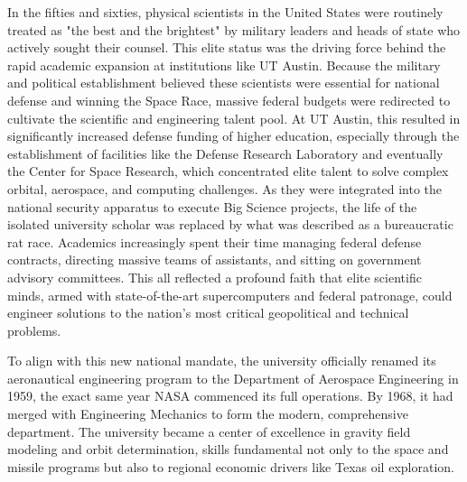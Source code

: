 In the fifties and sixties, physical scientists in the United States were routinely treated as "the best and the brightest" by military leaders and heads of state who actively sought their counsel. This elite status was the driving force behind the rapid academic expansion at institutions like UT Austin. Because the military and political establishment believed these scientists were essential for national defense and winning the Space Race, massive federal budgets were redirected to cultivate the scientific and engineering talent pool. At UT Austin, this resulted in significantly increased defense funding of higher education, especially through the establishment of facilities like the Defense Research Laboratory and eventually the Center for Space Research, which concentrated elite talent to solve complex orbital, aerospace, and computing challenges. As they were integrated into the national security apparatus to execute Big Science projects, the life of the isolated university scholar was replaced by what was described as a bureaucratic rat race. Academics increasingly spent their time managing federal defense contracts, directing massive teams of assistants, and sitting on government advisory committees. This all reflected a profound faith that elite scientific minds, armed with state-of-the-art supercomputers and federal patronage, could engineer solutions to the nation's most critical geopolitical and technical problems. 

To align with this new national mandate, the university officially renamed its aeronautical engineering program to the Department of Aerospace Engineering in 1959, the exact same year NASA commenced its full operations. By 1968, it had merged with Engineering Mechanics to form the modern, comprehensive department. The university became a center of excellence in gravity field modeling and orbit determination, skills fundamental not only to the space and missile programs but also to regional economic drivers like Texas oil exploration. 

